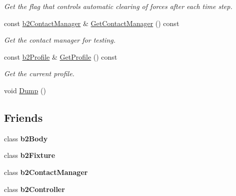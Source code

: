 \begin{DoxyCompactItemize}
\begin{DoxyCompactList}\small\item\em Get the flag that controls automatic clearing of forces after each time step. \end{DoxyCompactList}\item 
\hypertarget{classb2_world_a16259159ae1719c30808561c990a8c05}{const \hyperlink{classb2_contact_manager}{b2\-Contact\-Manager} \& \hyperlink{classb2_world_a16259159ae1719c30808561c990a8c05}{Get\-Contact\-Manager} () const }\label{classb2_world_a16259159ae1719c30808561c990a8c05}

\begin{DoxyCompactList}\small\item\em Get the contact manager for testing. \end{DoxyCompactList}\item 
\hypertarget{classb2_world_af41b3f1a21efc854b485d311911e24b2}{const \hyperlink{structb2_profile}{b2\-Profile} \& \hyperlink{classb2_world_af41b3f1a21efc854b485d311911e24b2}{Get\-Profile} () const }\label{classb2_world_af41b3f1a21efc854b485d311911e24b2}

\begin{DoxyCompactList}\small\item\em Get the current profile. \end{DoxyCompactList}\item 
void \hyperlink{classb2_world_a73c1fec260d460514edd335d4c235893}{Dump} ()
\end{DoxyCompactItemize}
\subsection*{Friends}
\begin{DoxyCompactItemize}
\item 
\hypertarget{classb2_world_a010ab52de250e5fe30a45d642f46405b}{class {\bfseries b2\-Body}}\label{classb2_world_a010ab52de250e5fe30a45d642f46405b}

\item 
\hypertarget{classb2_world_afb35b0e61f6ee3cc516c40ea251f3236}{class {\bfseries b2\-Fixture}}\label{classb2_world_afb35b0e61f6ee3cc516c40ea251f3236}

\item 
\hypertarget{classb2_world_aece264d42f69aed410f5eb3beba6ddf2}{class {\bfseries b2\-Contact\-Manager}}\label{classb2_world_aece264d42f69aed410f5eb3beba6ddf2}

\item 
\hypertarget{classb2_world_ad0171f9dac44cc7aae065c618c0d165b}{class {\bfseries b2\-Controller}}\label{classb2_world_ad0171f9dac44cc7aae065c618c0d165b}

\end{DoxyCompactItemize}



